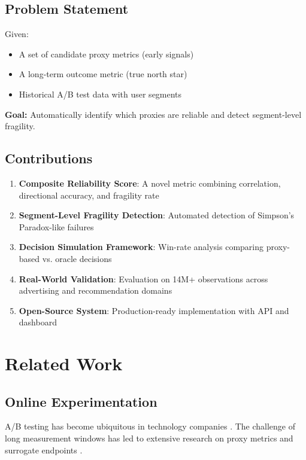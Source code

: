 \documentclass[11pt,twocolumn]{article}
\begin{document}
\subsection{Problem Statement}

Given:
\begin{itemize}
    \item A set of candidate proxy metrics (early signals)
    \item A long-term outcome metric (true north star)
    \item Historical A/B test data with user segments
\end{itemize}

\textbf{Goal:} Automatically identify which proxies are reliable and detect segment-level fragility.

\subsection{Contributions}

\begin{enumerate}
    \item \textbf{Composite Reliability Score}: A novel metric combining correlation, directional accuracy, and fragility rate
    \item \textbf{Segment-Level Fragility Detection}: Automated detection of Simpson's Paradox-like failures
    \item \textbf{Decision Simulation Framework}: Win-rate analysis comparing proxy-based vs. oracle decisions
    \item \textbf{Real-World Validation}: Evaluation on 14M+ observations across advertising and recommendation domains
    \item \textbf{Open-Source System}: Production-ready implementation with API and dashboard
\end{enumerate}

\section{Related Work}

\subsection{Online Experimentation}

A/B testing has become ubiquitous in technology companies \cite{kohavi2009controlled,kohavi2013online}. The challenge of long measurement windows has led to extensive research on proxy metrics and surrogate endpoints \cite{deng2016continuous}.
\end{document}
